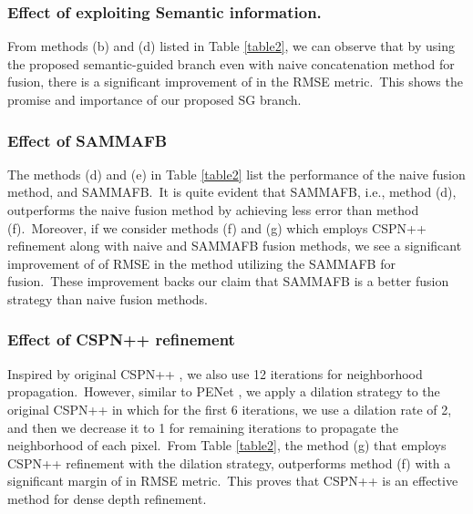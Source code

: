 \documentclass{ieeeaccess}
\begin{document}
\subsubsection{Effect of exploiting Semantic information.}


From methods (b) and (d) listed in Table \ref{table2}, we can observe that by using the proposed semantic-guided branch even with naive concatenation method for fusion, there is a significant improvement of  in the RMSE metric.~This shows the promise and importance of our proposed SG branch. 

\subsubsection{Effect of SAMMAFB}


The methods (d) and (e) in Table \ref{table2} list the performance of the naive fusion method, and SAMMAFB.~It is quite evident that SAMMAFB, i.e., method (d), outperforms the naive fusion method by achieving  less error than method (f).~Moreover, if we consider methods (f) and (g) which employs CSPN++ refinement along with naive and SAMMAFB fusion methods, we see a significant improvement of  of RMSE in the method utilizing the SAMMAFB for fusion.~These improvement backs our claim that SAMMAFB is a better fusion strategy than naive fusion methods.
\subsubsection{Effect of CSPN++ refinement}



Inspired by original CSPN++ \cite{cheng2020cspn++}, we also use 12 iterations for neighborhood propagation.~However, similar to PENet \cite{hu2020PENet}, we apply a dilation strategy to the original CSPN++ in which for the first 6 iterations, we use a dilation rate of 2, and then we decrease it to 1 for remaining iterations to propagate the neighborhood of each pixel.~From Table \ref{table2}, the method (g) that employs CSPN++ refinement with the dilation strategy, outperforms method (f) with a significant margin of  in RMSE metric.~This proves that CSPN++ is an effective method for dense depth refinement.
\end{document}
